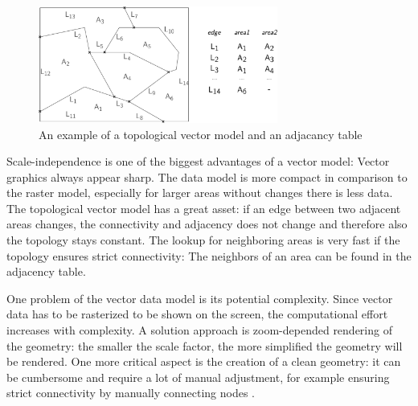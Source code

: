 \begin{figure}[ht]
  \centering
  \includegraphics[width=0.7\textwidth]{graphics/basics/topological_vector_model}
  \caption{An example of a topological vector model and an adjacancy table}
  \label{fig:topological_vector_model}
\end{figure}

Scale-independence is one of the biggest advantages of a vector model: Vector graphics always appear sharp. The data model is more compact in comparison to the raster model, especially for larger areas without changes there is less data. The topological vector model has a great asset: if an edge between two adjacent areas changes, the connectivity and adjacency does not change and therefore also the topology stays constant. The lookup for neighboring areas is very fast if the topology ensures strict connectivity: The neighbors of an area can be found in the adjacency table.

One problem of the vector data model is its potential complexity. Since vector data has to be rasterized to be shown on the screen, the computational effort increases with complexity. A solution approach is zoom-depended rendering of the geometry: the smaller the scale factor, the more simplified the geometry will be rendered.
One more critical aspect is the creation of a clean geometry: it can be cumbersome and require a lot of manual adjustment, for example ensuring strict connectivity by manually connecting nodes
\cite[pp.33-42]{bolstad2008gis}.


